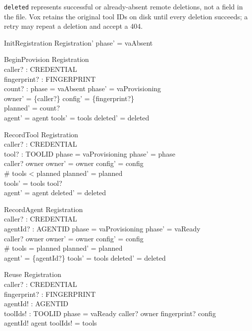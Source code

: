 \documentclass[a4paper,10pt,fleqn]{article}
\begin{document}
\texttt{deleted} represents successful or already-absent remote deletions,
not a field in the file. Vox retains the original tool IDs on disk until
every deletion succeeds; a retry may repeat a deletion and accept a 404.

\begin{schema}{InitRegistration}
  Registration'
\where
  phase' = vaAbsent
\end{schema}

\begin{schema}{BeginProvision}
  \Delta Registration \\
  caller? : CREDENTIAL \\
  fingerprint? : FINGERPRINT \\
  count? : \nat
\where
  phase = vaAbsent \land phase' = vaProvisioning \\
  owner' = \{caller?\} \land config' = \{fingerprint?\} \\
  planned' = count? \\
  agent' = agent \land tools' = tools \land deleted' = deleted
\end{schema}

\begin{schema}{RecordTool}
  \Delta Registration \\
  caller? : CREDENTIAL \\
  tool? : TOOLID
\where
  phase = vaProvisioning \land phase' = phase \\
  caller? \in owner \land owner' = owner \land config' = config \\
  \# tools < planned \land planned' = planned \\
  tools' = tools \cat \langle tool? \rangle \\
  agent' = agent \land deleted' = deleted
\end{schema}

\begin{schema}{RecordAgent}
  \Delta Registration \\
  caller? : CREDENTIAL \\
  agentId? : AGENTID
\where
  phase = vaProvisioning \land phase' = vaReady \\
  caller? \in owner \land owner' = owner \land config' = config \\
  \# tools = planned \land planned' = planned \\
  agent' = \{agentId?\} \land tools' = tools \land deleted' = deleted
\end{schema}

\begin{schema}{Reuse}
  \Xi Registration \\
  caller? : CREDENTIAL \\
  fingerprint? : FINGERPRINT \\
  agentId! : AGENTID \\
  toolIds! : \seq TOOLID
\where
  phase = vaReady \land caller? \in owner \land fingerprint? \in config \\
agentId! \in agent \land toolIds! = tools
\end{schema}
\end{document}
